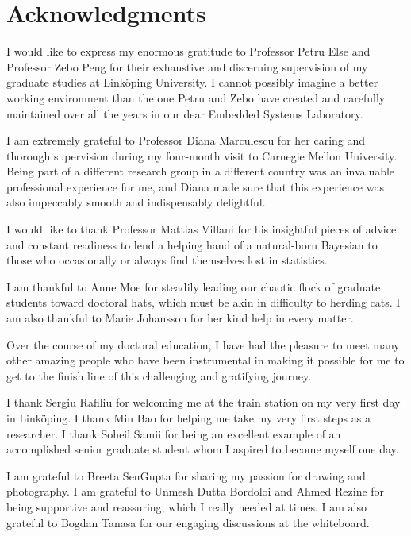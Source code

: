 \chapter*{Acknowledgments}
\newcommand\person[2]{#2 #1}

I would like to express my enormous gratitude to Professor \person{Else}{Petru}
and Professor \person{Peng}{Zebo} for their exhaustive and discerning
supervision of my graduate studies at Linköping University. I cannot possibly
imagine a better working environment than the one Petru and Zebo have created
and carefully maintained over all the years in our dear Embedded Systems
Laboratory.

I am extremely grateful to Professor \person{Marculescu}{Diana} for her caring
and thorough supervision during my four-month visit to Carnegie Mellon
University. Being part of a different research group in a different country was
an invaluable professional experience for me, and Diana made sure that this
experience was also impeccably smooth and indispensably delightful.

I would like to thank Professor \person{Villani}{Mattias} for his insightful
pieces of advice and constant readiness to lend a helping hand of a natural-born
Bayesian to those who occasionally or always find themselves lost in statistics.

I am thankful to \person{Moe}{Anne} for steadily leading our chaotic flock of
graduate students toward doctoral hats, which must be akin in difficulty to
herding cats. I am also thankful to \person{Johansson}{Marie} for her kind help
in every matter.

Over the course of my doctoral education, I have had the pleasure to meet many
other amazing people who have been instrumental in making it possible for me to
get to the finish line of this challenging and gratifying journey.

I thank \person{Rafiliu}{Sergiu} for welcoming me at the train station on my
very first day in Linköping. I thank \person{Bao}{Min} for helping me take my
very first steps as a researcher. I thank \person{Samii}{Soheil} for being an
excellent example of an accomplished senior graduate student whom I aspired to
become myself one day.

I am grateful to \person{SenGupta}{Breeta} for sharing my passion for drawing
and photography. I am grateful to \person{Dutta Bordoloi}{Unmesh} and
\person{Rezine}{Ahmed} for being supportive and reassuring, which I really
needed at times. I am also grateful to \person{Tanasa}{Bogdan} for our engaging
discussions at the whiteboard.

